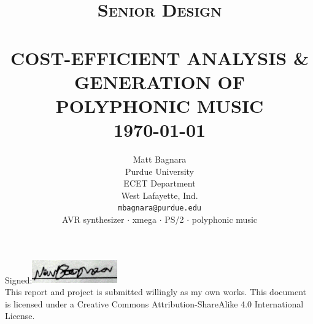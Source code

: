 \documentclass[bibtotocnumbered,abstract=on,paper=a4,fontsize=12pt,parskip=on,halfparskip=on]{scrartcl}		%
\title{	\normalsize \textsc{Senior Design} 	%
		 	\\[2.0cm]													%
			\HRule{0.5pt} \\										%
			\LARGE \textbf{\uppercase{Cost-Efficient Analysis \& Generation of Polyphonic Music}}	%
			\HRule{2pt} \\ [0.5cm]								%
			\normalsize \today									%
		}
\author{
		Matt Bagnara\\	
		Purdue University\\	
		ECET Department\\
    West Lafayette, Ind.\\
    \texttt{mbagnara@purdue.edu} \\ 
    \vskip 1cm 
    \scriptsize{AVR synthesizer $\cdot$ xmega $\cdot$ PS/2 $\cdot$ polyphonic music}\\
}
\makeatletter
\def\printtitle{%
    {\centering \@title\par}}
\def\printauthor{%
    {\centering \large \@author}}
\makeatother
\begin{document}
\begin{titlepage}
\thispagestyle{empty}				%

\printtitle									%
  	\vfill
\printauthor								%
    \vfill
    Signed:\includegraphics[height=1cm]{img/signature.png}\\
This report and project is submitted willingly as my own works. This document is licensed under a Creative  Commons Attribution-ShareAlike 4.0 International License.
\end{titlepage}
\newpage
\end{document}
